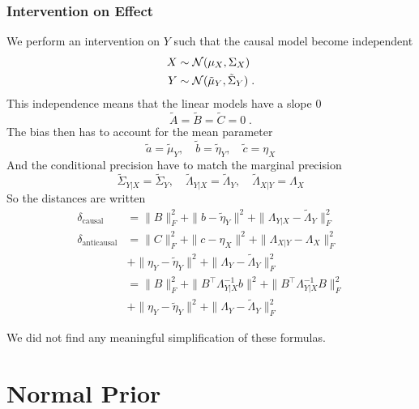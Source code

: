 \begin{subappendices}
 \subsubsection{Intervention on Effect}
We perform an intervention on $Y$ such that the causal model become independent
\begin{align*}
    X &\sim {\mathcal N}(\mu_X, \Sigma_X) \\
    Y &\sim {\mathcal N}(\tilde \mu_Y, \tilde \Sigma_{Y}) \; .
\end{align*}
This independence means that the linear models have a slope 0
\begin{equation}
\tilde A= \tilde B = \tilde C = 0 \; .
\end{equation}
The bias then has to account for the mean parameter
\begin{equation}
    \tilde a = \tilde \mu_Y,
    \quad \tilde b = \tilde \eta_Y,
    \quad \tilde c = \eta_X
\end{equation}
And the conditional precision have to match the marginal precision
\begin{equation}
    \tilde \Sigma_{Y|X} = \tilde \Sigma_Y ,
    \quad \tilde \Lambda_{Y|X} = \tilde \Lambda_Y,
    \quad \tilde \Lambda_{X|Y} = \Lambda_X
\end{equation}
So the distances are written
\begin{align*}
    \delta_\text{causal}
    &= \|B\|_F^2
    + \|b - \tilde \eta_Y\|^2 
    +  \|\Lambda_{Y|X} - \tilde \Lambda_Y \|^2_F \\
    \delta_\text{anticausal}
    &= \|C\|_F^2
    + \|c - \eta_X \|^2
    + \|\Lambda_{X|Y} - \Lambda_X \|^2_F\\
    &+ \| \eta_Y - \tilde \eta_Y \|^2
    + \| \Lambda_Y - \tilde \Lambda_Y \|_F^ 2 \\
    &= \|B\|_F^2
    + \|B^\top\Lambda_{Y|X}^{-1}b \|^2
    + \|B^\top\Lambda_{Y|X}^{-1}B\|^2_F\\
    &+ \| \eta_Y - \tilde \eta_Y \|^2
    + \| \Lambda_Y - \tilde \Lambda_Y \|_F^ 2
\end{align*}

We did not find any meaningful simplification of these formulas. 
 
\section{{Normal Prior}}
\label{apdx:normal_experiments}
 

\end{subappendices}
